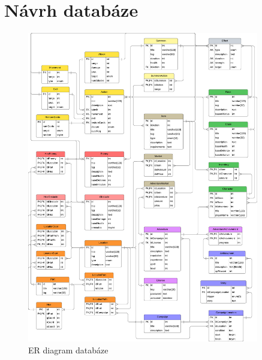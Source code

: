 \chapter{Návrh databáze}
\label{sec:database}

\begin{figure}[h]
    \centering
    \includegraphics[width=0.9\textwidth]{../../shared/diagrams/dbScheme.pdf}
    \caption{ER diagram databáze}
    \label{fig:dix:database_schema}
\end{figure}
